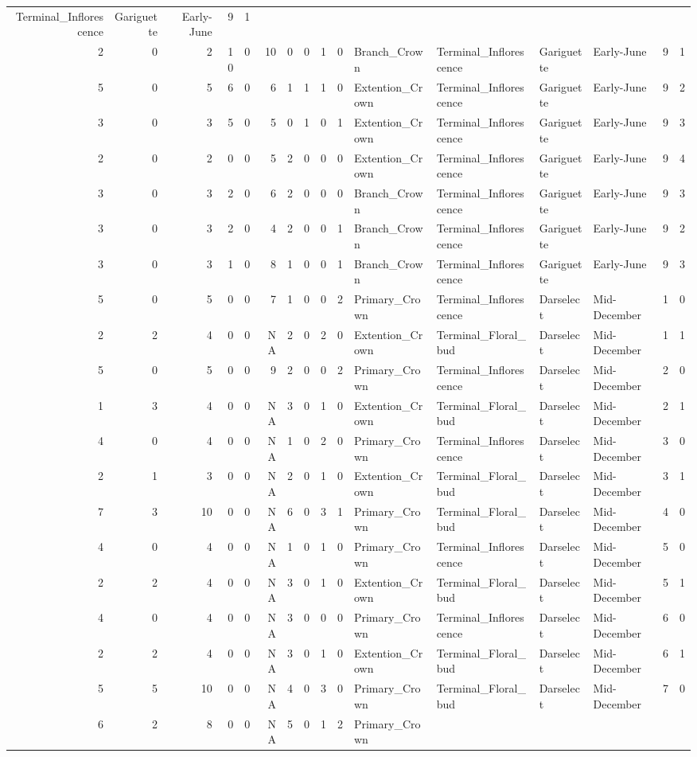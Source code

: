 \documentclass[]{article}
\begin{document}
\begin{longtable}[]{@{}rrrrrrrrrrllllrl@{}}
Terminal\_Inflorescence & Gariguette & Early-June & 9 & 1\tabularnewline
2 & 0 & 2 & 10 & 0 & 10 & 0 & 0 & 1 & 0 & Branch\_Crown &
Terminal\_Inflorescence & Gariguette & Early-June & 9 & 1\tabularnewline
5 & 0 & 5 & 6 & 0 & 6 & 1 & 1 & 1 & 0 & Extention\_Crown &
Terminal\_Inflorescence & Gariguette & Early-June & 9 & 2\tabularnewline
3 & 0 & 3 & 5 & 0 & 5 & 0 & 1 & 0 & 1 & Extention\_Crown &
Terminal\_Inflorescence & Gariguette & Early-June & 9 & 3\tabularnewline
2 & 0 & 2 & 0 & 0 & 5 & 2 & 0 & 0 & 0 & Extention\_Crown &
Terminal\_Inflorescence & Gariguette & Early-June & 9 & 4\tabularnewline
3 & 0 & 3 & 2 & 0 & 6 & 2 & 0 & 0 & 0 & Branch\_Crown &
Terminal\_Inflorescence & Gariguette & Early-June & 9 & 3\tabularnewline
3 & 0 & 3 & 2 & 0 & 4 & 2 & 0 & 0 & 1 & Branch\_Crown &
Terminal\_Inflorescence & Gariguette & Early-June & 9 & 2\tabularnewline
3 & 0 & 3 & 1 & 0 & 8 & 1 & 0 & 0 & 1 & Branch\_Crown &
Terminal\_Inflorescence & Gariguette & Early-June & 9 & 3\tabularnewline
5 & 0 & 5 & 0 & 0 & 7 & 1 & 0 & 0 & 2 & Primary\_Crown &
Terminal\_Inflorescence & Darselect & Mid-December & 1 &
0\tabularnewline
2 & 2 & 4 & 0 & 0 & NA & 2 & 0 & 2 & 0 & Extention\_Crown &
Terminal\_Floral\_bud & Darselect & Mid-December & 1 & 1\tabularnewline
5 & 0 & 5 & 0 & 0 & 9 & 2 & 0 & 0 & 2 & Primary\_Crown &
Terminal\_Inflorescence & Darselect & Mid-December & 2 &
0\tabularnewline
1 & 3 & 4 & 0 & 0 & NA & 3 & 0 & 1 & 0 & Extention\_Crown &
Terminal\_Floral\_bud & Darselect & Mid-December & 2 & 1\tabularnewline
4 & 0 & 4 & 0 & 0 & NA & 1 & 0 & 2 & 0 & Primary\_Crown &
Terminal\_Inflorescence & Darselect & Mid-December & 3 &
0\tabularnewline
2 & 1 & 3 & 0 & 0 & NA & 2 & 0 & 1 & 0 & Extention\_Crown &
Terminal\_Floral\_bud & Darselect & Mid-December & 3 & 1\tabularnewline
7 & 3 & 10 & 0 & 0 & NA & 6 & 0 & 3 & 1 & Primary\_Crown &
Terminal\_Floral\_bud & Darselect & Mid-December & 4 & 0\tabularnewline
4 & 0 & 4 & 0 & 0 & NA & 1 & 0 & 1 & 0 & Primary\_Crown &
Terminal\_Inflorescence & Darselect & Mid-December & 5 &
0\tabularnewline
2 & 2 & 4 & 0 & 0 & NA & 3 & 0 & 1 & 0 & Extention\_Crown &
Terminal\_Floral\_bud & Darselect & Mid-December & 5 & 1\tabularnewline
4 & 0 & 4 & 0 & 0 & NA & 3 & 0 & 0 & 0 & Primary\_Crown &
Terminal\_Inflorescence & Darselect & Mid-December & 6 &
0\tabularnewline
2 & 2 & 4 & 0 & 0 & NA & 3 & 0 & 1 & 0 & Extention\_Crown &
Terminal\_Floral\_bud & Darselect & Mid-December & 6 & 1\tabularnewline
5 & 5 & 10 & 0 & 0 & NA & 4 & 0 & 3 & 0 & Primary\_Crown &
Terminal\_Floral\_bud & Darselect & Mid-December & 7 & 0\tabularnewline
6 & 2 & 8 & 0 & 0 & NA & 5 & 0 & 1 & 2 & Primary\_Crown &

\end{longtable}
\end{document}
